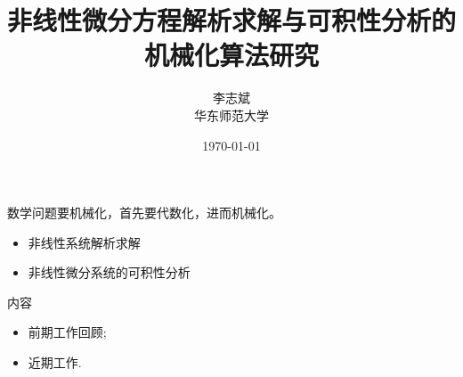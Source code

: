 \documentclass{beamer}
\title[]{非线性微分方程解析求解与可积性分析的机械化算法研究}
\author[]{李志斌 \\[1em] 华东师范大学}
\date{\today}
\begin{document}

\begin{frame}
     \mbox{} \hskip 2cm 数学问题要机械化，首先要代数化，进而机械化。\\[3mm]
     \begin{itemize}
     \item 非线性系统解析求解
     \item 非线性微分系统的可积性分析
     \end{itemize}
\end{frame}
\begin{frame}{内容}
\begin{itemize}
  \item 前期工作回顾; 
  \item 近期工作. 
  \end{itemize}
\end{frame}
\end{document}
